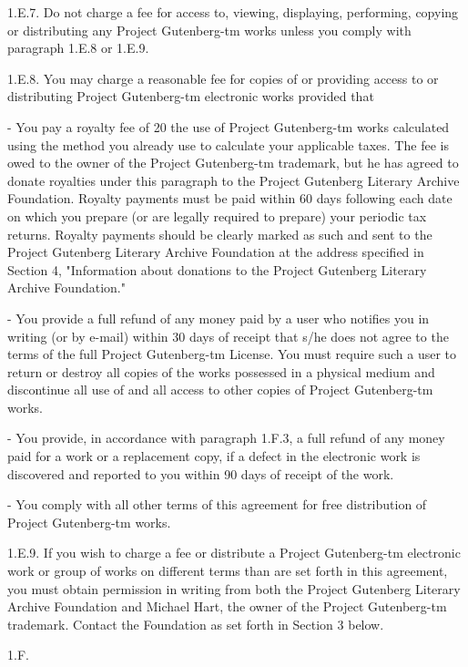 1.E.7.  Do not charge a fee for access to, viewing, displaying,
performing, copying or distributing any Project Gutenberg-tm works
unless you comply with paragraph 1.E.8 or 1.E.9.

1.E.8.  You may charge a reasonable fee for copies of or providing
access to or distributing Project Gutenberg-tm electronic works provided
that

- You pay a royalty fee of 20%
     the use of Project Gutenberg-tm works calculated using the method
     you already use to calculate your applicable taxes.  The fee is
     owed to the owner of the Project Gutenberg-tm trademark, but he
     has agreed to donate royalties under this paragraph to the
     Project Gutenberg Literary Archive Foundation.  Royalty payments
     must be paid within 60 days following each date on which you
     prepare (or are legally required to prepare) your periodic tax
     returns.  Royalty payments should be clearly marked as such and
     sent to the Project Gutenberg Literary Archive Foundation at the
     address specified in Section 4, "Information about donations to
     the Project Gutenberg Literary Archive Foundation."

- You provide a full refund of any money paid by a user who notifies
     you in writing (or by e-mail) within 30 days of receipt that s/he
     does not agree to the terms of the full Project Gutenberg-tm
     License.  You must require such a user to return or
     destroy all copies of the works possessed in a physical medium
     and discontinue all use of and all access to other copies of
     Project Gutenberg-tm works.

- You provide, in accordance with paragraph 1.F.3, a full refund of any
     money paid for a work or a replacement copy, if a defect in the
     electronic work is discovered and reported to you within 90 days
     of receipt of the work.

- You comply with all other terms of this agreement for free
     distribution of Project Gutenberg-tm works.

1.E.9.  If you wish to charge a fee or distribute a Project Gutenberg-tm
electronic work or group of works on different terms than are set
forth in this agreement, you must obtain permission in writing from
both the Project Gutenberg Literary Archive Foundation and Michael
Hart, the owner of the Project Gutenberg-tm trademark.  Contact the
Foundation as set forth in Section 3 below.

1.F.

